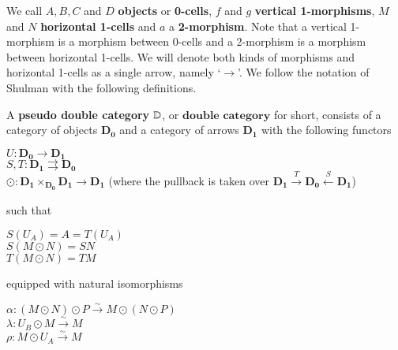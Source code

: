 \documentclass{amsart}
\begin{document}
We call $A, B, C$ and $D$ \textbf{objects} or \textbf{0-cells}, $f$ and $g$ \textbf{vertical 1-morphisms}, $M$ and $N$ \textbf{horizontal 1-cells} and $a$ a \textbf{2-morphism}. Note that a vertical 1-morphism is a morphism between 0-cells and a 2-morphism is a morphism between horizontal 1-cells. We will denote both kinds of morphisms and horizontal 1-cells as a single arrow, namely `$\to$'. We follow the notation of Shulman \cite{Shul} with the following definitions.

\begin{defn}
A \textbf{pseudo double category} $\mathbb{D}$, or $\textbf{double category}$ for short, consists of a category of objects $\mathbf{D_{0}}$ and a category of arrows $\mathbf{D_{1}}$ with the following functors
\begin{center}
$U\colon \mathbf{D_{0}} \to \mathbf{D_{1}}$\\
$S,T \colon \mathbf{D_{1}} \rightrightarrows \mathbf{D_{0}}$\\
$\odot \colon \mathbf{D_{1}} \times_{\mathbf{D_{0}}} \mathbf{D_{1}} \to \mathbf{D_{1}}$ (where the pullback is taken over $\mathbf{D_{1}} \xrightarrow[]{T} \mathbf{D_{0}} \xleftarrow[]{S} \mathbf{D_{1}}$) \\
\end{center}
 such that \\
\begin{center}
$S(U_{A})=A=T(U_{A})$\\
$S(M \odot N)=SN$\\
$T(M \odot N)=TM$\\
\end{center}
equipped with natural isomorphisms
\begin{center}

$\alpha \colon (M \odot N) \odot P \xrightarrow{\sim} M \odot (N \odot P)$\\
$\lambda \colon U_{B} \odot M \xrightarrow{\sim} M$\\
$\rho \colon M \odot U_{A} \xrightarrow{\sim} M$


\end{center}
\end{defn}
\end{document}
